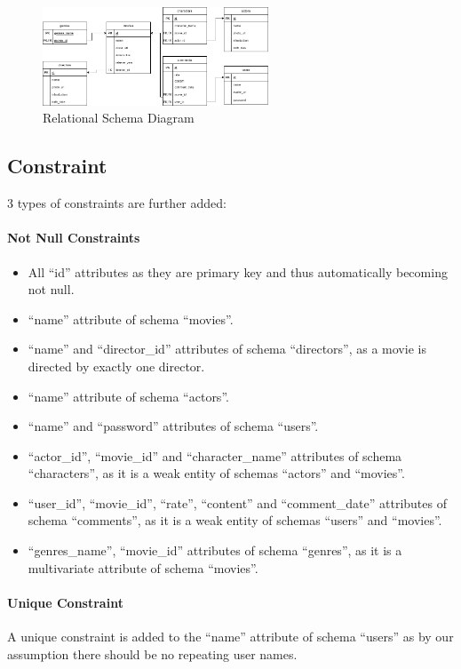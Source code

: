 \begin{CJK*}{UTF8}{gbsn}
\begin{figure}[h]
\centering
\label{RelationalSchema}
\includegraphics[width=0.6\textwidth]{schema.png}
\caption{Relational Schema Diagram}
\end{figure}

\subsection{Constraint}
3 types of constraints are further added:
\paragraph{Not Null Constraints}
\begin{itemize}
\item All ``id'' attributes as they are primary key and thus automatically becoming not null.
\item ``name'' attribute of schema ``movies''.
\item ``name'' and ``director\_id'' attributes of schema ``directors'', as a movie is directed by exactly one director.
\item ``name'' attribute of schema ``actors''.
\item ``name'' and ``password'' attributes of schema ``users''.
\item ``actor\_id'', ``movie\_id'' and ``character\_name'' attributes of schema ``characters'', as it is a weak entity of schemas ``actors'' and ``movies''.
\item ``user\_id'', ``movie\_id'', ``rate'', ``content'' and ``comment\_date'' attributes of schema ``comments'', as it is a weak entity of schemas ``users'' and ``movies''.
\item ``genres\_name'', ``movie\_id'' attributes of schema ``genres'', as it is a multivariate attribute of schema ``movies''.
\end{itemize}
\paragraph{Unique Constraint}
A unique constraint is added to the ``name'' attribute of schema ``users'' as by our assumption there should be no repeating user names. 

\end{CJK*}

